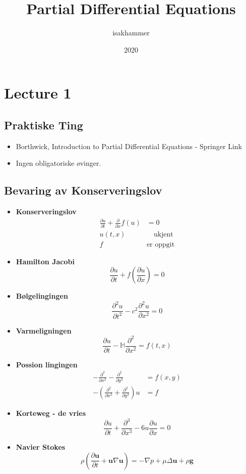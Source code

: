 \documentclass{article}
\title{Partial Differential Equations}
\author{isakhammer }
\date{2020}
\theoremstyle{remark}
\begin{document}
\maketitle
\tableofcontents
\newpage

\newpage
\section{Lecture 1}%
\label{sec:lecture_1}
 \subsection{Praktiske Ting}%
 \label{sub:book}
 
 \begin{itemize}
   \item
 Borthwick, Introduction to Partial Differential Equations - Springer Link
 \item Ingen obligatoriske øvinger.

 \end{itemize}

 \subsection{Bevaring av Konserveringslov}%
 \label{sub:bevaring_av_konserveringslov}
 
 \begin{itemize}
   \item
\textbf{Konserveringslov}  \[
  \begin{split}
    \frac{\partial u}{\partial t} + \frac{\partial }{\partial x} f\left( u \right) &= 0\\
    u\left( t,x \right)  &  \quad \text{ukjent}  \\
    f \quad  & \text{er oppgit} 
  \end{split}
\] 
\item
\textbf{Hamilton Jacobi} \[
\frac{\partial u}{\partial t}  +  f \left( \frac{\partial u}{\partial x} \right)  = 0
\] 
\item \textbf{Bølgelingingen}  \[
\frac{\partial ^{2} u }{\partial t^{2}} - c^2 \frac{\partial ^2u}{\partial x^2}  = 0
\] 
\item \textbf{Varmeligningen} \[
\frac{\partial u}{\partial t} - \mathbb{H} \frac{\partial ^2}{\partial x^2}  = f\left( t,x \right) 
\] 
\item  \textbf{Possion lingingen} \[
    \begin{split}
- \frac{\partial ^2}{\partial x^2}  - \frac{\partial ^2}{\partial y^2}   & = f\left( x,y \right) \\
-\left( \frac{\partial ^2}{\partial x^2}  + \frac{\partial ^2}{\partial y^2}  \right)u &= f 
    \end{split}
\] 
\item \textbf{Korteweg - de vries} \[
\frac{\partial u}{\partial t}  + \frac{\partial ^{3}}{\partial x^{3}}  - 6u \frac{\partial u}{\partial x} = 0
\]  
\item \textbf{Navier Stokes} \[
\rho \left( \frac{\partial \mathbf{u}}{\partial t}  + \mathbf{u} \nabla \mathbf{u} \right) = - \nabla p + \mu \Delta \mathbf{u} + \rho \mathbf{g} 
\] 

 \end{itemize}
\end{document}
